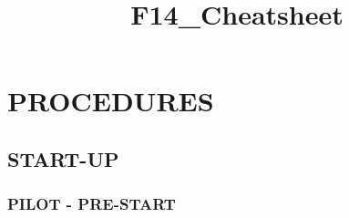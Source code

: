 \documentclass[10pt,usenames,dvipsnames,twoside]{report}
\title{F14_Cheatsheet}
\begin{document}
	
	\cleardoublepage

	\thumbnar
	\dominitoc
	\tableofcontents
	\cleardoublepage

	\setcounter{page}{1}
	\pagestyle{plain}

	\chapter{PROCEDURES}
	\minitoc
	\cleardoublepage

	\section{START-UP}
	\thumbnar

	\subsection{PILOT - PRE-START}
\end{document}
